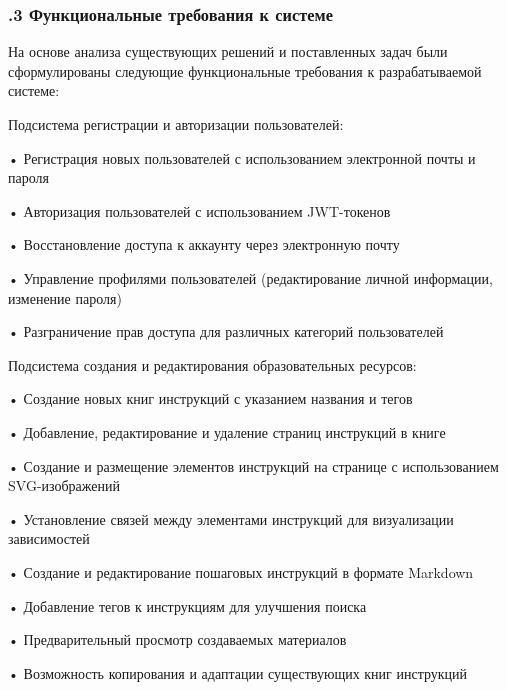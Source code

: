 \subtitlespace

\subsubsection*{ 
  \gostTitleFont
  .3 Функциональные требования к системе
} 

\subtitlespace

{\gostFont

  \par \redline На основе анализа существующих решений и поставленных задач были сформулированы следующие функциональные требования к разрабатываемой системе:

  \par \redline Подсистема регистрации и авторизации пользователей:

  \par \redline • Регистрация новых пользователей с использованием электронной почты и пароля
  \par \redline • Авторизация пользователей с использованием JWT-токенов
  \par \redline • Восстановление доступа к аккаунту через электронную почту
  \par \redline • Управление профилями пользователей (редактирование личной информации, изменение пароля)
  \par \redline • Разграничение прав доступа для различных категорий пользователей

  \par \redline Подсистема создания и редактирования образовательных ресурсов:

  \par \redline • Создание новых книг инструкций с указанием названия и тегов
  \par \redline • Добавление, редактирование и удаление страниц инструкций в книге
  \par \redline • Создание и размещение элементов инструкций на странице с использованием SVG-изображений
  \par \redline • Установление связей между элементами инструкций для визуализации зависимостей
  \par \redline • Создание и редактирование пошаговых инструкций в формате Markdown
  \par \redline • Добавление тегов к инструкциям для улучшения поиска
  \par \redline • Предварительный просмотр создаваемых материалов
  \par \redline • Возможность копирования и адаптации существующих книг инструкций

}
